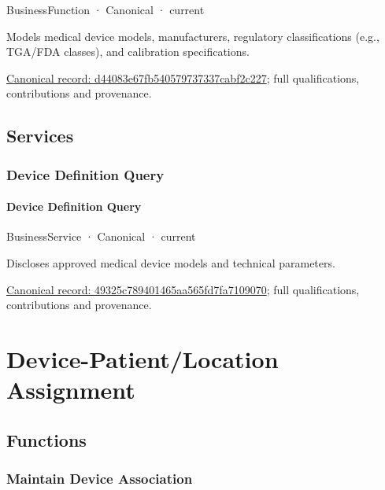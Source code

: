 \label{element:d44083e67fb540579737337cabf2c227}
{\small BusinessFunction · Canonical · current}\par

Models medical device models, manufacturers, regulatory classifications (e.g., TGA/FDA classes), and calibration specifications.


{\footnotesize \href{../../../../continuum/business/business-function/d44083e67fb540579737337cabf2c227.md}{Canonical record: d44083e67fb540579737337cabf2c227}; full qualifications, contributions and provenance.}\par
\subsection{Services}

\subsubsection{Device Definition Query}

\paragraph{Device Definition Query}

\label{element:49325c789401465aa565fd7fa7109070}
{\small BusinessService · Canonical · current}\par

Discloses approved medical device models and technical parameters.


{\footnotesize \href{../../../../continuum/business/business-service/49325c789401465aa565fd7fa7109070.md}{Canonical record: 49325c789401465aa565fd7fa7109070}; full qualifications, contributions and provenance.}\par
\section{Device-Patient/Location Assignment}

\subsection{Functions}

\subsubsection{Maintain Device Association}

